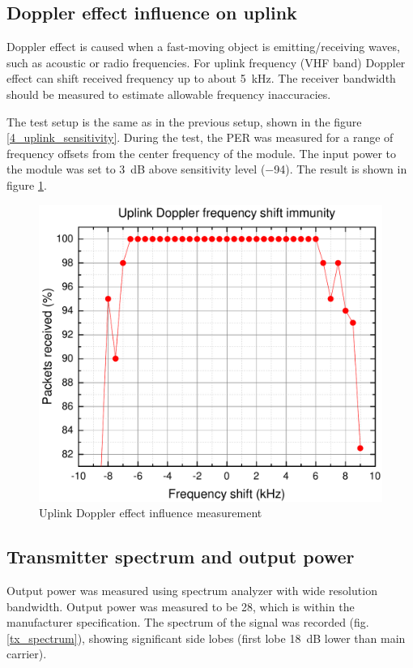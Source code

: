 \subsection{Doppler effect influence on uplink}
Doppler effect is caused when a fast-moving object is emitting/receiving waves, such as acoustic or radio frequencies. For uplink frequency (VHF band) Doppler effect can shift received frequency up to about \SI{5}{\kHz}. The receiver bandwidth should be measured to estimate allowable frequency inaccuracies.

The test setup is the same as in the previous setup, shown in the figure \ref{4_uplink_sensitivity}. During the test, the PER was measured for a range of frequency offsets from the center frequency of the module. The input power to the module was set to \SI{3}{\dB} above sensitivity level (\SI{-94}{\dBm}). The result is shown in figure \ref{4_uplink_doppler_measurement}.
\begin{figure}[H]
    \centering
    \includegraphics[width=0.6\paperwidth]{img/6/uplink_doppler.pdf}
    \caption{Uplink Doppler effect influence measurement}
    \label{4_uplink_doppler_measurement}
\end{figure}


\subsection{Transmitter spectrum and output power}
Output power was measured using spectrum analyzer with wide resolution bandwidth. Output power was measured to be \SI{28}{\dBm}, which is within the manufacturer specification.
The spectrum of the signal was recorded (fig. \ref{tx_spectrum}), showing significant side lobes (first lobe \SI{18}{\dB} lower than main carrier).

